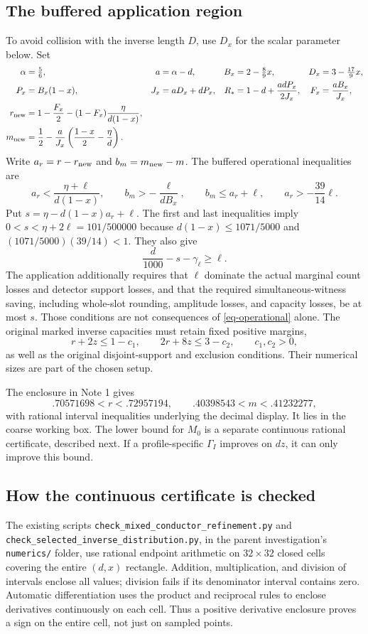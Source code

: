 \documentclass[11pt]{article}
\theoremstyle{definition}
\begin{document}
\subsection{The buffered application region}
To avoid collision with the inverse length $D$, use $D_x$ for the scalar parameter below. Set
\begin{align*}
 \alpha&=\tfrac56,& a&=\alpha-d,&
 B_x&=2-\tfrac89x,&D_x&=3-\tfrac{17}{9}x,\\
 P_x&=B_x(1-x),&J_x&=aD_x+dP_x,&
 R_*&=1-d+\frac{adP_x}{2J_x},&F_x&=\frac{aB_x}{J_x},\\
 r_{\rm new}&=1-\frac{F_x}{2}
 -(1-F_x)\frac{\eta}{d(1-x)},&&&&\\
 m_{\rm new}&=\frac12-\frac{a}{J_x}
 \left(\frac{1-x}{2}-\frac{\eta}{d}\right).&&&&
\end{align*}
Write $a_r=r-r_{\rm new}$ and $b_m=m_{\rm new}-m$. The buffered operational inequalities are
\begin{equation}\label{eq-operational}
 a_r<\frac{\eta+\ell}{d(1-x)},\qquad
 b_m> -\frac{\ell}{dB_x},\qquad
 b_m\le a_r+\ell,\qquad
 a_r> -\frac{39}{14}\ell.
\end{equation}
Put $s=\eta-d(1-x)a_r+\ell$. The first and last inequalities imply
$0<s<\eta+2\ell=101/500000$ because
$d(1-x)\le1071/5000$ and $(1071/5000)(39/14)<1$.
They also give
\[
 \frac d{1000}-s-\gamma_\ell\ge\ell.
\]
The application additionally requires that $\ell$ dominate the actual marginal count losses and detector support losses, and that the required simultaneous-witness saving, including whole-slot rounding, amplitude losses, and capacity losses, be at most $s$. Those conditions are not consequences of \eqref{eq-operational} alone. The original marked inverse capacities must retain fixed positive margins,
\[
 r+2z\le1-c_1,\qquad 2r+8z\le3-c_2,
 \qquad c_1,c_2>0,
\]
as well as the original disjoint-support and exclusion conditions. Their numerical sizes are part of the chosen setup.

The enclosure in Note 1 gives
\[
 .70571698<r<.72957194,\qquad .40398543<m<.41232277,
\]
with rational interval inequalities underlying the decimal display. It lies in the coarse working box. The lower bound for $M_0$ is a separate continuous rational certificate, described next. If a profile-specific $\Gamma_I$ improves on $dz$, it can only improve this bound.

\subsection{How the continuous certificate is checked}
The existing scripts \nolinkurl{check_mixed_conductor_refinement.py} and
\nolinkurl{check_selected_inverse_distribution.py}, in the parent investigation's \nolinkurl{numerics/} folder, use rational endpoint arithmetic on $32\times32$ closed cells covering the entire $(d,x)$ rectangle. Addition, multiplication, and division of intervals enclose all values; division fails if its denominator interval contains zero. Automatic differentiation uses the product and reciprocal rules to enclose derivatives continuously on each cell. Thus a positive derivative enclosure proves a sign on the entire cell, not just on sampled points.
\end{document}
